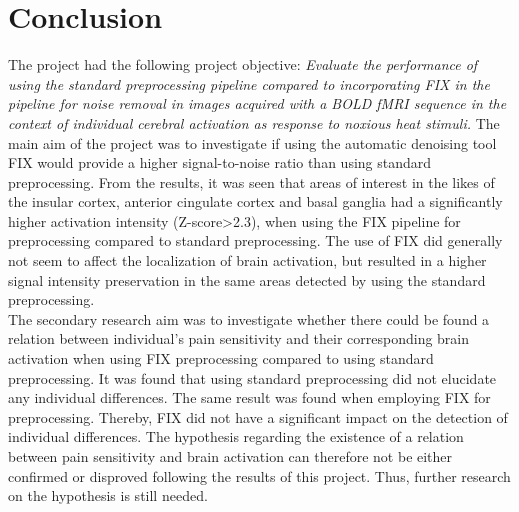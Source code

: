\chapter{Conclusion}

The project had the following project objective: \textit{Evaluate the performance of using the standard preprocessing pipeline compared to incorporating FIX in the pipeline for noise removal in images acquired with a BOLD fMRI sequence in the context of individual cerebral activation as response to noxious heat stimuli.} The main aim of the project was to investigate if using the automatic denoising tool FIX would provide a higher signal-to-noise ratio than using standard preprocessing. From the results, it was seen that areas of interest in the likes of the insular cortex, anterior cingulate cortex and basal ganglia had a significantly higher activation intensity (Z-score>2.3), when using the FIX pipeline for preprocessing compared to standard preprocessing. The use of FIX did generally not seem to affect the localization of brain activation, but resulted in a higher signal intensity preservation in the same areas detected by using the standard preprocessing. \\
The secondary research aim was to investigate whether there could be found a relation between individual’s pain sensitivity and their corresponding brain activation when using FIX preprocessing compared to using standard preprocessing. It was found that using standard preprocessing did not elucidate any individual differences. The same result was found when employing FIX for preprocessing. Thereby, FIX did not have a significant impact on the detection of individual differences. The hypothesis regarding the existence of a relation between pain sensitivity and brain activation can therefore not be either confirmed or disproved following the results of this project. Thus, further research on the hypothesis is still needed. 